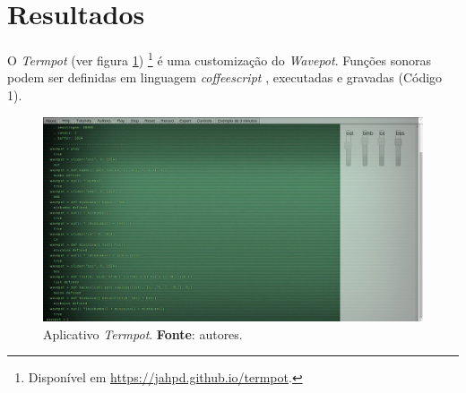 \section{Resultados}\label{sec:termpot}

O \emph{Termpot} (ver figura \ref{fig:termpot}) \footnote{Disponível em \url{https://jahpd.github.io/termpot}.} é uma customização do \emph{Wavepot}. Funções sonoras podem ser definidas em linguagem \emph{coffeescript} \cite{burnham2011coffeescript}, executadas e gravadas (Código 1). %

\begin{figure}[!h]
\centering
\includegraphics[scale=0.3]{termpot.png}
\caption{Aplicativo \emph{Termpot}. \textbf{Fonte}: autores.}
\label{fig:termpot}
\end{figure}

